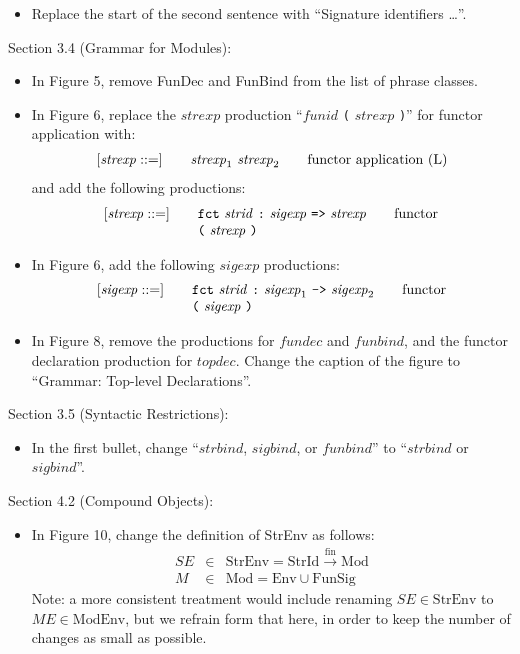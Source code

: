 \documentclass[twoside,titlepage]{article}
\newcommand{\finto}{\ensuremath{\xrightarrow{\text{fin}}}}
\begin{document}
\begin{appendix}
\begin{itemize}
\item Replace the start of the second sentence with ``Signature identifiers \dots''.
\end{itemize}

Section 3.4 (Grammar for Modules):
\begin{itemize}
\item In Figure 5, remove FunDec and FunBind from the list of phrase classes.

\item In Figure 6, replace the $\mathit{strexp}$ production ``$\mathit{funid}$ {\tt(} $\mathit{strexp}$ {\tt)}'' for functor application with:
  $$
  \begin{array}{l@{\qquad}l@{\qquad}l}
  [\mathit{strexp} ::=] & \mathit{strexp}_1~\mathit{strexp}_2 & \textrm{functor application (L)}
  \end{array}
  $$
  and add the following productions:
  $$
  \begin{array}{l@{\qquad}l@{\qquad}l}
  [\mathit{strexp} ::=] & {\tt{fct}}~\mathit{strid}~\mbox{\tt:}~\mathit{sigexp}~\mbox{\tt=>}~\mathit{strexp} & \textrm{functor} \\
  & \mbox{\tt(}~\mathit{strexp}~\mbox{\tt)}
  \end{array}
  $$

\item In Figure 6, add the following $\mathit{sigexp}$ productions:
  $$
  \begin{array}{l@{\qquad}l@{\qquad}l}
  [\mathit{sigexp} ::=] & {\tt{fct}}~\mathit{strid}~\mbox{\tt:}~\mathit{sigexp}_1~\mbox{\tt->}~\mathit{sigexp}_2 & \textrm{functor} \\
  & \mbox{\tt(}~\mathit{sigexp}~\mbox{\tt)}
  \end{array}
  $$

\item In Figure 8, remove the productions for $\mathit{fundec}$ and $\mathit{funbind}$, and the functor declaration production for $\mathit{topdec}$. Change the caption of the figure to ``Grammar: Top-level Declarations''.
\end{itemize}

Section 3.5 (Syntactic Restrictions):
\begin{itemize}
\item In the first bullet, change ``$\mathit{strbind}$, $\mathit{sigbind}$, or $\mathit{funbind}$'' to ``$\mathit{strbind}$ or $\mathit{sigbind}$''.
\end{itemize}

Section 4.2 (Compound Objects):
\begin{itemize}
\item In Figure 10, change the definition of StrEnv as follows:
  \begin{eqnarray*}
  \mathit{SE} &\in& \mbox{StrEnv} = \mbox{StrId} \finto \mbox{Mod} \\
  \mathit{M} &\in& \mbox{Mod} = \mbox{Env} \cup \mbox{FunSig}
  \end{eqnarray*}
  Note: a more consistent treatment would include renaming $\mathit{SE} \in \mbox{StrEnv}$ to $\mathit{ME} \in \mbox{ModEnv}$, but we refrain form that here, in order to keep the number of changes as small as possible.


\end{itemize}
\end{appendix}
\end{document}
